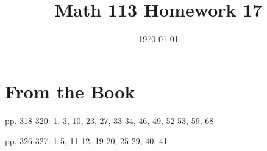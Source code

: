 \documentclass[fleqn,addpoints]{exam}
\title{Math 113 Homework 17}
\author{}
\date{\today}
\begin{document}
\maketitle






\section{From the Book}

\begin{itemize*}
  \item pp. 318-320: 1, 3, 10, 23, 27, 33-34, 46, 49, 52-53, 59, 68 
  \item pp. 326-327: 1-5, 11-12, 19-20, 25-29, 40, 41
\end{itemize*}


\ifprintanswers
\end{document}
